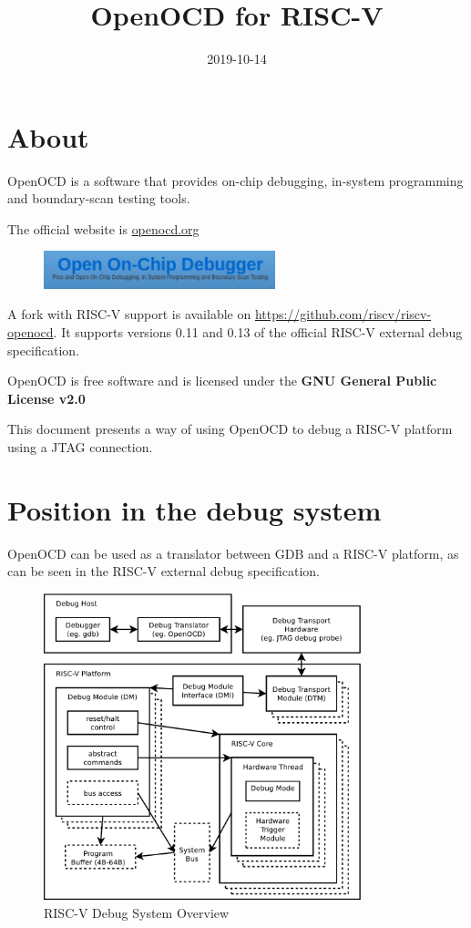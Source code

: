 \documentclass{article}
\title{OpenOCD for RISC-V}
\date{2019-10-14}
\begin{document}
	\maketitle
	
	\section{About}
	
	OpenOCD is a software that provides on-chip debugging, in-system programming and boundary-scan testing tools.
	
	The official website is \url{openocd.org}
	
	\begin{figure}[H]
	\centering
	\includegraphics[width=0.6\textwidth]{openocd.png}
	\end{figure}
	
	A fork with RISC-V support is available on \url{https://github.com/riscv/riscv-openocd}. It supports versions 0.11 and 0.13 of the official RISC-V external debug specification.
	
	OpenOCD is free software and is licensed under the \textbf{GNU General Public License v2.0}
	
	This document presents a way of using OpenOCD to debug a RISC-V platform using a JTAG connection.
	
	
	\newpage
	\section{Position in the debug system}
	
	OpenOCD can be used as a translator between GDB and a RISC-V platform, as can be seen in the RISC-V external debug specification.
	
	\begin{figure}[H]
   	\centering
   	\includegraphics[width=0.82\textwidth]{overview.pdf}
   	\caption{RISC-V Debug System Overview}
   	\label{fig:overview}
	\end{figure}
	
\end{document}
